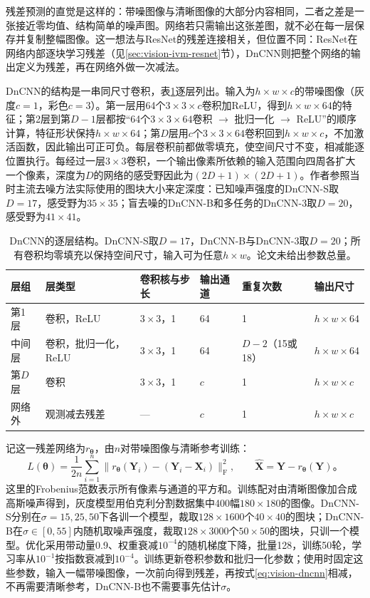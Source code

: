 残差预测的直觉是这样的：带噪图像与清晰图像的大部分内容相同，二者之差是一张接近零均值、结构简单的噪声图。网络若只需输出这张差图，就不必在每一层保存并复制整幅图像。这一想法与ResNet的残差连接相关，但位置不同：ResNet在网络内部逐块学习残差（见\ref{sec:vision-ivm-resnet}节），DnCNN则把整个网络的输出定义为残差，再在网络外做一次减法。

DnCNN的结构是一串同尺寸卷积，表\ref{tab:vision-dncnn-layers}逐层列出。输入为$h\times w\times c$的带噪图像（灰度$c=1$，彩色$c=3$）。第一层用64个$3\times3\times c$卷积加ReLU，得到$h\times w\times64$的特征；第2层到第$D-1$层都按“64个$3\times3\times64$卷积 \ensuremath{\to} 批归一化 \ensuremath{\to} ReLU”的顺序计算，特征形状保持$h\times w\times64$；第$D$层用$c$个$3\times3\times64$卷积回到$h\times w\times c$，不加激活函数，因此输出可正可负。每层卷积前都做零填充，使空间尺寸不变，相减能逐位置执行。每经过一层$3\times3$卷积，一个输出像素所依赖的输入范围向四周各扩大一个像素，深度为$D$的网络的感受野因此为$(2D+1)\times(2D+1)$。作者参照当时主流去噪方法实际使用的图块大小来定深度：已知噪声强度的DnCNN-S取$D=17$，感受野为$35\times35$；盲去噪的DnCNN-B和多任务的DnCNN-3取$D=20$，感受野为$41\times41$。

\begin{table}[htbp]
 \centering
 \small
 \begin{tabularx}{\linewidth}{@{}p{14mm}Xp{14mm}p{10mm}p{16mm}p{18mm}@{}}
  \toprule
  层组 & 层类型 & 卷积核与步长 & 输出通道 & 重复次数 & 输出尺寸\\
  \midrule
  第1层 & 卷积，ReLU & $3\times3$，1 & 64 & 1 & $h\times w\times64$\\
  中间层 & 卷积，批归一化，ReLU & $3\times3$，1 & 64 & $D-2$（15或18） & $h\times w\times64$\\
  第$D$层 & 卷积 & $3\times3$，1 & $c$ & 1 & $h\times w\times c$\\
  网络外 & 观测减去残差 & — & $c$ & 1 & $h\times w\times c$\\
  \bottomrule
 \end{tabularx}
 \caption{DnCNN的逐层结构。DnCNN-S取$D=17$，DnCNN-B与DnCNN-3取$D=20$；所有卷积均零填充以保持空间尺寸，输入可为任意$h\times w$。论文未给出参数总量。}
 \label{tab:vision-dncnn-layers}
\end{table}

记这一残差网络为$r_{\bm{\theta}}$，由$n$对带噪图像与清晰参考训练：
\begin{equation}
 L(\bm{\theta})=\frac{1}{2n}\sum_{i=1}^{n}
 \bigl\lVert r_{\bm{\theta}}(\bm{Y}_i)
             -(\bm{Y}_i-\bm{X}_i)\bigr\rVert_{\mathrm{F}}^2,
 \qquad
 \widehat{\bm{X}}=\bm{Y}-r_{\bm{\theta}}(\bm{Y})\text{。}
 \label{eq:vision-dncnn}
\end{equation}
这里的Frobenius范数表示所有像素与通道的平方和。训练配对由清晰图像加合成高斯噪声得到，灰度模型用伯克利分割数据集中400幅$180\times180$的图像。DnCNN-S分别在$\sigma=15,25,50$下各训一个模型，裁取$128\times1600$个$40\times40$的图块；DnCNN-B在$\sigma\in[0,55]$内随机取噪声强度，裁取$128\times3000$个$50\times50$的图块，只训一个模型。优化采用带动量0.9、权重衰减$10^{-4}$的随机梯度下降，批量128，训练50轮，学习率从$10^{-1}$按指数衰减到$10^{-4}$。训练更新卷积参数和批归一化参数；使用时固定这些参数，输入一幅带噪图像，一次前向得到残差，再按式\eqref{eq:vision-dncnn}相减，不再需要清晰参考，DnCNN-B也不需要事先估计$\sigma$。

